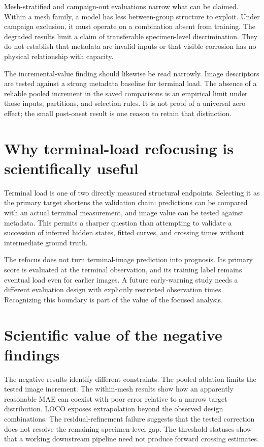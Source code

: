 Mesh-stratified and campaign-out evaluations narrow what can be claimed. Within a mesh family, a model has less between-group structure to exploit. Under campaign exclusion, it must operate on a combination absent from training. The degraded results limit a claim of transferable specimen-level discrimination. They do not establish that metadata are invalid inputs or that visible corrosion has no physical relationship with capacity.

The incremental-value finding should likewise be read narrowly. Image descriptors are tested against a strong metadata baseline for terminal load. The absence of a reliable pooled increment in the saved comparisons is an empirical limit under those inputs, partitions, and selection rules. It is not proof of a universal zero effect; the small post-onset result is one reason to retain that distinction.

\section{Why terminal-load refocusing is scientifically useful}
Terminal load is one of two directly measured structural endpoints. Selecting it as the primary target shortens the validation chain: predictions can be compared with an actual terminal measurement, and image value can be tested against metadata. This permits a sharper question than attempting to validate a succession of inferred hidden states, fitted curves, and crossing times without intermediate ground truth.

The refocus does not turn terminal-image prediction into prognosis. Its primary score is evaluated at the terminal observation, and its training label remains eventual load even for earlier images. A future early-warning study needs a different evaluation design with explicitly restricted observation times. Recognizing this boundary is part of the value of the focused analysis.

\section{Scientific value of the negative findings}
The negative results identify different constraints. The pooled ablation limits the tested image increment. The within-mesh results show how an apparently reasonable MAE can coexist with poor error relative to a narrow target distribution. LOCO exposes extrapolation beyond the observed design combinations. The residual-refinement failure suggests that the tested correction does not resolve the remaining specimen-level gap. The threshold statuses show that a working downstream pipeline need not produce forward crossing estimates.

